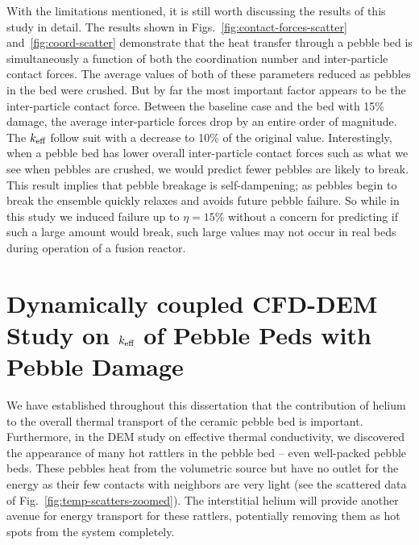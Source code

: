 With the limitations mentioned, it is still worth discussing the results of this study in detail. The results shown in Figs.~\ref{fig:contact-forces-scatter} and~\ref{fig:coord-scatter} demonstrate that the heat transfer through a pebble bed is simultaneously a function of both the coordination number and inter-particle contact forces. The average values of both of these parameters reduced as pebbles in the bed were crushed. But by far the most important factor appears to be the inter-particle contact force. Between the baseline case and the bed with 15\% damage, the average inter-particle forces drop by an entire order of magnitude. The $k_\text{eff}$ follow suit with a decrease to 10\% of the original value. Interestingly, when a pebble bed has lower overall inter-particle contact forces such as what we see when pebbles are crushed, we would predict fewer pebbles are likely to break. This result implies that pebble breakage is self-dampening; as pebbles begin to break the ensemble quickly relaxes and avoids future pebble failure. So while in this study we induced failure up to $\eta = 15\%$ without a concern for predicting if such a large amount would break, such large values may not occur in real beds during operation of a fusion reactor. 














\section{Dynamically coupled CFD-DEM Study on $k_\text{eff}$ of Pebble Peds with Pebble Damage}\label{sec:cfd-dem-studies}

We have established throughout this dissertation that the contribution of helium to the overall thermal transport of the ceramic pebble bed is important. Furthermore, in the DEM study on effective thermal conductivity, we discovered the appearance of many hot rattlers in the pebble bed -- even well-packed pebble beds. These pebbles heat from the volumetric source but have no outlet for the energy as their few contacts with neighbors are very light (see the scattered data of Fig.~\ref{fig:temp-scatters-zoomed}). The interstitial helium will provide another avenue for energy transport for these rattlers, potentially removing them as hot spots from the system completely. 

